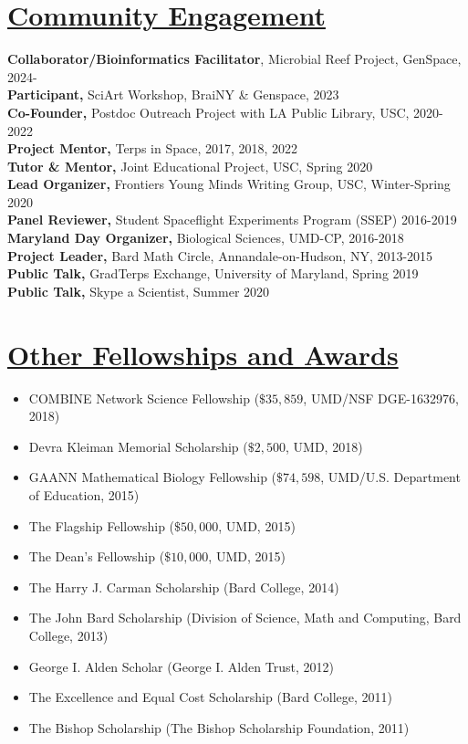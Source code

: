 \documentclass[]{res}
\begin{document}
\begin{resume}
\section{\underline{Community Engagement}}\vspace{2mm}
{\bf Collaborator/Bioinformatics Facilitator}, Microbial Reef Project, GenSpace, 2024-\\
{\bf Participant,} SciArt Workshop, BraiNY \& Genspace, 2023\\
{\bf Co-Founder,} Postdoc Outreach Project with LA Public Library, USC, 2020-2022\\
{\bf Project Mentor,} Terps in Space, 2017, 2018, 2022\\
{\bf Tutor \& Mentor,} Joint Educational Project, USC, Spring 2020\\
{\bf Lead Organizer,} Frontiers Young Minds Writing Group, USC, Winter-Spring 2020\\
{\bf Panel Reviewer,} Student Spaceflight Experiments Program (SSEP) 2016-2019\\
{\bf Maryland Day Organizer,} Biological Sciences, UMD-CP, 2016-2018\\
{\bf Project Leader,} Bard Math Circle, Annandale-on-Hudson, NY, 2013-2015 \\
{\bf Public Talk,} GradTerps Exchange, University of Maryland, Spring 2019\\
{\bf Public Talk,} Skype a Scientist, Summer 2020

  
   \section{\underline{Other Fellowships and Awards}} %
\begin{itemize}[leftmargin=*]
\item[] COMBINE Network Science Fellowship ($\$35,859$, UMD/NSF DGE-1632976, 2018)
\item[] Devra Kleiman Memorial Scholarship ($\$2,500$, UMD, 2018)
\item[] GAANN Mathematical Biology Fellowship ($\$74,598$, UMD/U.S. Department of Education, 2015)
\item[] The Flagship Fellowship ($\$50,000$, UMD, 2015)
\item[] The Dean's Fellowship ($\$10,000$, UMD, 2015)
\item[] The Harry J. Carman Scholarship (Bard College, 2014)
\item[] The John Bard Scholarship (Division of Science, Math and Computing, Bard College, 2013)
\item[] George I. Alden Scholar (George I. Alden Trust, 2012)%
\item[] The Excellence and Equal Cost Scholarship (Bard College, 2011) 
\item[] The Bishop Scholarship (The Bishop Scholarship Foundation, 2011)
\end{itemize}
  

\end{resume}
\end{document}
